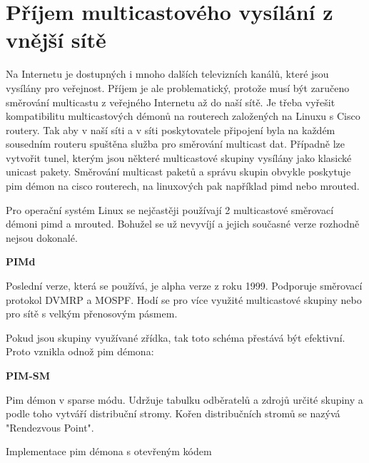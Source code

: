 \chapter{Příjem multicastového vysílání z vnější sítě}

Na Internetu je dostupných i mnoho dalších televizních kanálů, které jsou vysílány pro veřejnost. Příjem je ale problematický, protože musí být zaručeno směrování multicastu z veřejného Internetu až do naší sítě. Je třeba vyřešit kompatibilitu multicastových démonů na routerech založených na Linuxu s Cisco routery. Tak aby v naší síti a v síti poskytovatele připojení byla na každém sousedním routeru spuštěna služba pro směrování multicast dat. Případně lze vytvořit tunel, kterým jsou některé multicastové skupiny vysílány jako klasické unicast pakety. Směrování multicast paketů a správu skupin obvykle poskytuje pim démon na cisco routerech, na linuxových pak například pimd nebo mrouted.

\vspace{10pt}

Pro operační systém Linux se nejčastěji používají 2 multicastové směrovací démoni pimd a mrouted. Bohužel se už nevyvíjí a jejich současné verze rozhodně nejsou dokonalé.

\vspace{10pt}

\textbf{PIMd}

\vspace{5pt}

Poslední verze, která se používá, je alpha verze z roku 1999. Podporuje směrovací protokol DVMRP a MOSPF. Hodí se pro více využité multicastové skupiny nebo pro sítě s velkým přenosovým pásmem.

\vspace{10pt}

Pokud jsou skupiny využívané zřídka, tak toto schéma přestává být efektivní. Proto vznikla odnož pim démona:

\vspace{10pt}

\textbf{PIM-SM}

\vspace{5pt}

Pim démon v sparse módu. Udržuje tabulku odběratelů a zdrojů určité skupiny a podle toho vytváří distribuční stromy. Kořen distribučních stromů se nazývá "Rendezvous Point".

\vspace{10pt}

Implementace pim démona s otevřeným kódem

